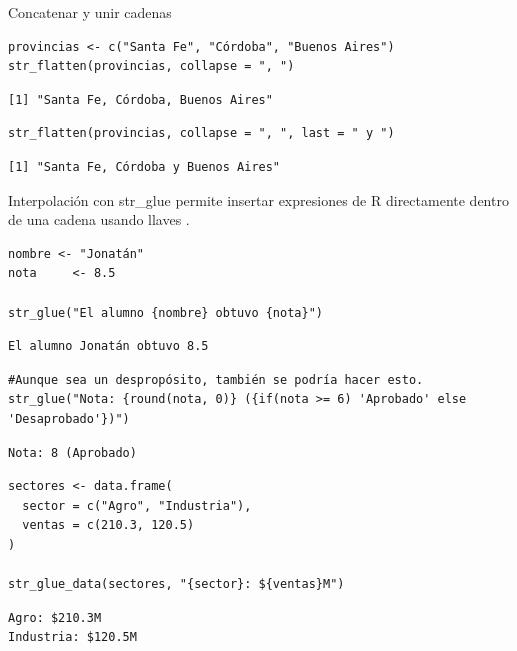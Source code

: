 \documentclass[8pt]{beamer}
\begin{document}
\begin{frame}[fragile]{Concatenar y unir cadenas}

\begin{lstlisting}[style=RScript]
provincias <- c("Santa Fe", "Córdoba", "Buenos Aires")
str_flatten(provincias, collapse = ", ")
\end{lstlisting}
\begin{lstlisting}[style=RConsole]
[1] "Santa Fe, Córdoba, Buenos Aires"
\end{lstlisting}
\begin{lstlisting}[style=RScript]
str_flatten(provincias, collapse = ", ", last = " y ")
\end{lstlisting}
\begin{lstlisting}[style=RConsole]
[1] "Santa Fe, Córdoba y Buenos Aires"
\end{lstlisting}

\end{frame}




\begin{frame}[fragile]{Interpolación con str\_glue}
	 permite insertar expresiones de R directamente dentro de una cadena usando llaves .
\begin{lstlisting}[style=RScript]
nombre <- "Jonatán"
nota 	 <- 8.5

str_glue("El alumno {nombre} obtuvo {nota}")
\end{lstlisting}
\begin{lstlisting}[style=RConsole]
El alumno Jonatán obtuvo 8.5
\end{lstlisting}
\begin{lstlisting}[style=RScript]
#Aunque sea un despropósito, también se podría hacer esto.
str_glue("Nota: {round(nota, 0)} ({if(nota >= 6) 'Aprobado' else 'Desaprobado'})")
\end{lstlisting}
\begin{lstlisting}[style=RConsole]
Nota: 8 (Aprobado)
\end{lstlisting}

\begin{lstlisting}[style=RScript]
sectores <- data.frame(
  sector = c("Agro", "Industria"),
  ventas = c(210.3, 120.5)
)

str_glue_data(sectores, "{sector}: ${ventas}M")
\end{lstlisting}
\begin{lstlisting}[style=RConsole]
Agro: $210.3M
Industria: $120.5M
\end{lstlisting}
\end{frame}
\end{document}
